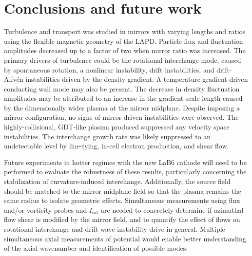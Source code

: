 \section{\label{sec:mirror-turb_conclusion}Conclusions and future work}

Turbulence and transport was studied in mirrors with varying lengths and ratios using the flexible magnetic geometry of the LAPD. Particle flux and fluctuation amplitudes decreased up to a factor of two when mirror ratio was increased. The primary drivers of turbulence could be the rotational interchange mode, caused by spontaneous rotation, a nonlinear instability, drift instabilities, and drift-Alfvén instabilities driven by the density gradient. A temperature gradient-driven conducting wall mode may also be present. The decrease in density fluctuation amplitudes may be attributed to an increase in the gradient scale length caused by the dimensionally wider plasma at the mirror midplane. Despite imposing a mirror configuration, no signs of mirror-driven instabilities were observed. The highly-collisional, GDT-like plasma produced suppressed any velocity space instabilities. The interchange growth rate was likely suppressed to an undetectable level by line-tying, in-cell electron production, and shear flow.

Future experiments in hotter regimes with the new LaB6 cathode \cite{LAPD_LaB6} will need to be performed to evaluate the robustness of these results, particularly concerning the stabilization of curvature-induced interchange. Additionally, the source field should be matched to the mirror midplane field so that the plasma remains the same radius to isolate geometric effects.
Simultaneous measurements using flux and/or vorticity probes and $I_\text{sat}$ are needed to concretely determine if azimuthal flow shear is modified by the mirror field, and to quantify the effect of flows on rotational interchange and drift wave instability drive in general.
Multiple simultaneous axial measurements of potential would enable better understanding of the axial wavenumber and identification of possible modes.

%
%


